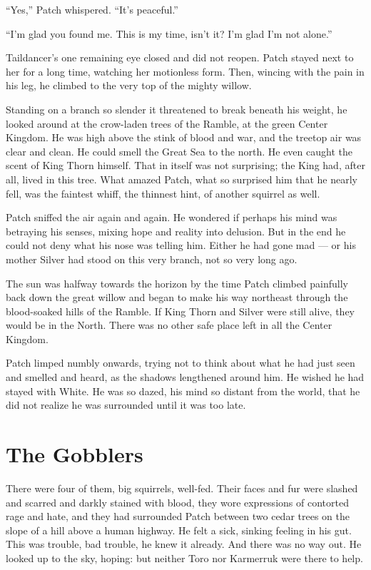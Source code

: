 \documentclass[12pt]{memoir}
\begin{document}
“Yes,” Patch whispered. “It’s peaceful.”

“I’m glad you found me. This is my time, isn’t it? I’m glad I’m not
alone.”

Taildancer’s one remaining eye closed and did not reopen. Patch stayed
next to her for a long time, watching her motionless form. Then,
wincing with the pain in his leg, he climbed to the very top of the
mighty willow.

Standing on a branch so slender it threatened to break beneath his
weight, he looked around at the crow-laden trees of the Ramble, at the
green Center Kingdom. He was high above the stink of blood and war,
and the treetop air was clear and clean. He could smell the Great Sea
to the north. He even caught the scent of King Thorn himself. That in
itself was not surprising; the King had, after all, lived in this
tree. What amazed Patch, what so surprised him that he nearly fell,
was the faintest whiff, the thinnest hint, of another squirrel as
well.

Patch sniffed the air again and again. He wondered if perhaps his mind
was betraying his senses, mixing hope and reality into delusion. But
in the end he could not deny what his nose was telling him. Either he
had gone mad — or his mother Silver had stood on this very branch, not
so very long ago.

The sun was halfway towards the horizon by the time Patch climbed
painfully back down the great willow and began to make his way
northeast through the blood-soaked hills of the Ramble. If King Thorn
and Silver were still alive, they would be in the North. There was no
other safe place left in all the Center Kingdom.

Patch limped numbly onwards, trying not to think about what he had
just seen and smelled and heard, as the shadows lengthened around
him. He wished he had stayed with White. He was so dazed, his mind so
distant from the world, that he did not realize he was surrounded
until it was too late.


\section{The Gobblers}

There were four of them, big squirrels, well-fed. Their faces and fur
were slashed and scarred and darkly stained with blood, they wore
expressions of contorted rage and hate, and they had surrounded Patch
between two cedar trees on the slope of a hill above a human
highway. He felt a sick, sinking feeling in his gut. This was trouble,
bad trouble, he knew it already. And there was no way out. He looked
up to the sky, hoping: but neither Toro nor Karmerruk were there to
help.
\end{document}
